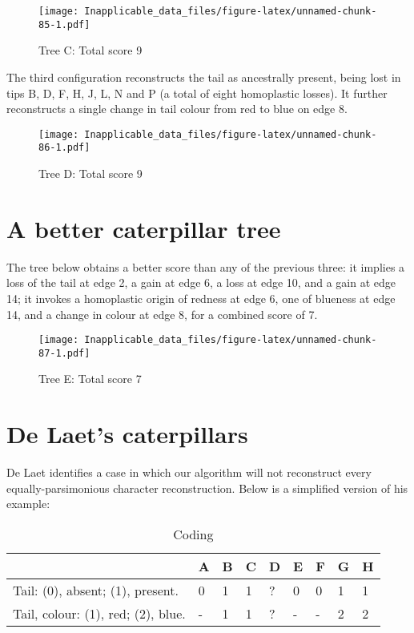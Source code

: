 \documentclass[]{book}
\theoremstyle{definition}
\theoremstyle{definition}
\theoremstyle{definition}
\theoremstyle{remark}
\begin{document}
\begin{figure}
\centering
\texttt{[image: Inapplicable\_data\_files/figure-latex/unnamed-chunk-85-1.pdf]}
\caption{\label{fig:unnamed-chunk-85}Tree C: Total score 9}
\end{figure}

The third configuration reconstructs the tail as ancestrally present,
being lost in tips B, D, F, H, J, L, N and P (a total of eight
homoplastic losses). It further reconstructs a single change in tail
colour from red to blue on edge 8.

\begin{figure}
\centering
\texttt{[image: Inapplicable\_data\_files/figure-latex/unnamed-chunk-86-1.pdf]}
\caption{\label{fig:unnamed-chunk-86}Tree D: Total score 9}
\end{figure}

\hypertarget{a-better-caterpillar-tree}{%
\section{A better caterpillar tree}\label{a-better-caterpillar-tree}}

The tree below obtains a better score than any of the previous three: it
implies a loss of the tail at edge 2, a gain at edge 6, a loss at edge
10, and a gain at edge 14; it invokes a homoplastic origin of redness at
edge 6, one of blueness at edge 14, and a change in colour at edge 8,
for a combined score of 7.

\begin{figure}
\centering
\texttt{[image: Inapplicable\_data\_files/figure-latex/unnamed-chunk-87-1.pdf]}
\caption{\label{fig:unnamed-chunk-87}Tree E: Total score 7}
\end{figure}

\hypertarget{de-laets-caterpillars}{%
\section{De Laet's caterpillars}\label{de-laets-caterpillars}}

De Laet \citeyearpar{DeLaet2017} identifies a case in which our
algorithm \citep{Brazeau2018} will not reconstruct every
equally-parsimonious character reconstruction. Below is a simplified
version of his example:

\begin{table}

\caption{\label{tab:unnamed-chunk-89}Coding}
\centering
\begin{tabular}[t]{l|l|l|l|l|l|l|l|l}
\hline
  & A & B & C & D & E & F & G & H\\
\hline
Tail: (0), absent; (1), present. & 0 & 1 & 1 & ? & 0 & 0 & 1 & 1\\
\hline
Tail, colour: (1), red; (2), blue. & - & 1 & 1 & ? & - & - & 2 & 2\\
\hline
\end{tabular}
\end{table}
\end{document}
